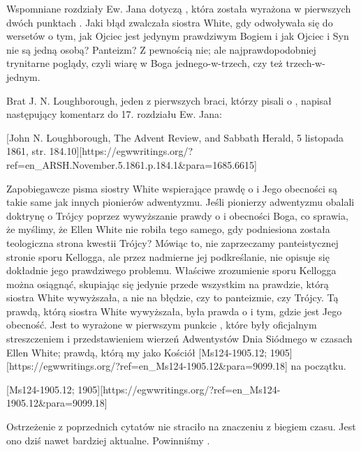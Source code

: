 Wspomniane rozdziały Ew. Jana dotyczą , która została wyrażona w pierwszych dwóch punktach . Jaki błąd zwalczała siostra White, gdy odwoływała się do wersetów o tym, jak Ojciec jest jedynym prawdziwym Bogiem i jak Ojciec i Syn nie są jedną osobą? Panteizm? Z pewnością nie; ale najprawdopodobniej trynitarne poglądy, czyli wiarę w Boga jednego-w-trzech, czy też trzech-w-jednym.

Brat J. N. Loughborough, jeden z pierwszych braci, którzy pisali o , napisał następujący komentarz do 17. rozdziału Ew. Jana:

[John N. Loughborough, The Advent Review, and Sabbath Herald, 5 listopada 1861, str. 184.10][https://egwwritings.org/?ref=en\_ARSH.November.5.1861.p.184.1&para=1685.6615]

Zapobiegawcze pisma siostry White wspierające prawdę o  i Jego obecności są takie same jak innych pionierów adwentyzmu. Jeśli pionierzy adwentyzmu obalali doktrynę o Trójcy poprzez wywyższanie prawdy o  i obecności Boga, co sprawia, że myślimy, że Ellen White nie robiła tego samego, gdy podniesiona została teologiczna strona kwestii Trójcy? Mówiąc to, nie zaprzeczamy panteistycznej stronie sporu Kellogga, ale przez nadmierne jej podkreślanie, nie opisuje się dokładnie jego prawdziwego problemu. Właściwe zrozumienie sporu Kellogga można osiągnąć, skupiając się jedynie przede wszystkim na prawdzie, którą siostra White wywyższała, a nie na błędzie, czy to panteizmie, czy Trójcy. Tą prawdą, którą siostra White wywyższała, była prawda o  i tym, gdzie jest Jego obecność. Jest to wyrażone w pierwszym punkcie , które były oficjalnym streszczeniem i przedstawieniem wierzeń Adwentystów Dnia Siódmego w czasach Ellen White; prawdą, którą my jako Kościół [Ms124-1905.12; 1905][https://egwwritings.org/?ref=en\_Ms124-1905.12&para=9099.18] na początku.

[Ms124-1905.12; 1905][https://egwwritings.org/?ref=en\_Ms124-1905.12&para=9099.18]

Ostrzeżenie z poprzednich cytatów nie straciło na znaczeniu z biegiem czasu. Jest ono dziś nawet bardziej aktualne. Powinniśmy .


